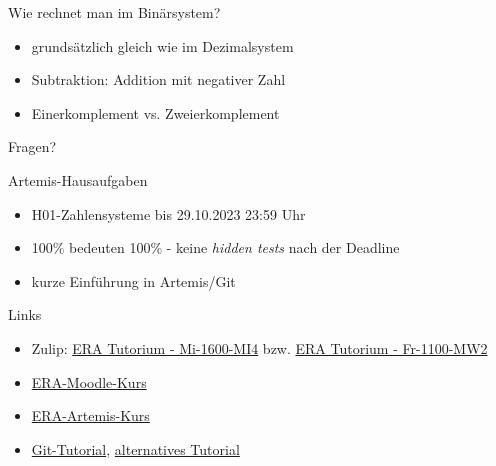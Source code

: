 \documentclass[
  german,            %
  aspectratio=169,    %
]{tumbeamer}
\begin{document}
\begin{frame}[c]{Wie rechnet man im Binärsystem?}{}
  \begin{itemize}
    \item grundsätzlich gleich wie im Dezimalsystem
    \item Subtraktion: Addition mit negativer Zahl
    \item Einerkomplement vs. Zweierkomplement
  \end{itemize}
\end{frame}

\begin{frame}[c]{}{}
  \begin{center}
    \LARGE Fragen?
  \end{center}
\end{frame}

\begin{frame}[c]{Artemis-Hausaufgaben}{}
  \begin{itemize}
    \item H01-Zahlensysteme bis 29.10.2023 23:59 Uhr
    \item 100\% bedeuten 100\% - keine \emph{hidden tests} nach der Deadline
    \item kurze Einführung in Artemis/Git
  \end{itemize}
\end{frame}

\begin{frame}[fragile, c]{Links}{}
  \begin{itemize}
    \item Zulip: \href{https://zulip.in.tum.de/#narrow/stream/1917-ERA-Tutorium---Mi-1600-MI4}{\glqq ERA Tutorium - Mi-1600-MI4\grqq}
    bzw. \href{https://zulip.in.tum.de/#narrow/stream/1940-ERA-Tutorium---Fr-1100-MW2}{\glqq ERA Tutorium - Fr-1100-MW2\grqq}
    \item \href{https://www.moodle.tum.de/course/view.php?id=90679}{ERA-Moodle-Kurs}
    \item \href{https://artemis.in.tum.de/courses/288/exercises}{ERA-Artemis-Kurs}
    \item \href{https://git-scm.com/docs/gittutorial}{Git-Tutorial}, \href{https://rogerdudler.github.io/git-guide/}{alternatives Tutorial}
  \end{itemize}
\end{frame}

\maketitle
\end{document}
